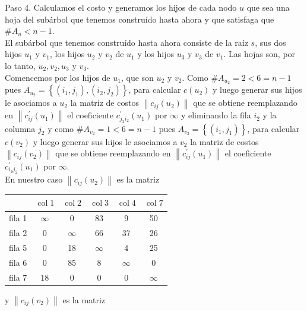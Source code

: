 \documentclass[10pt]{article}
\begin{document}
Paso 4. Calculamos el costo y generamos los hijos de cada nodo $u$ que sea una hoja del subárbol que tenemos construído hasta ahora y que satisfaga que $\# A_{u}<n-1$.\\
El subárbol que tenemos construído hasta ahora consiste de la raíz $s$, sus dos hijos $u_{1}$ y $v_{1}$, los hijos $u_{2}$ y $v_{2}$ de $u_{1}$ y los hijos $u_{3}$ y $v_{3}$ de $v_{1}$. Las hojas son, por lo tanto, $u_{2}, v_{2}, u_{3}$ y $v_{3}$.\\
Comencemos por los hijos de $u_{1}$, que son $u_{2}$ y $v_{2}$. Como $\# A_{u_{2}}=2<6=n-1$ pues $A_{u_{2}}=\left\{\left(i_{1}, j_{1}\right),\left(i_{2}, j_{2}\right)\right\}$, para calcular $c\left(u_{2}\right)$ y luego generar sus hijos le asociamos a $u_{2}$ la matriz de costos $\left\|c_{i j}\left(u_{2}\right)\right\|$ que se obtiene reemplazando en $\left\|c_{i j}^{\prime}\left(u_{1}\right)\right\|$ el coeficiente $c_{j_{2} i_{2}}^{\prime}\left(u_{1}\right)$ por $\infty$ y eliminando la fila $i_{2}$ y la columna $j_{2}$ y como $\# A_{v_{2}}=1<6=n-1$ pues $A_{v_{2}}=\left\{\left(i_{1}, j_{1}\right)\right\}$, para calcular $c\left(v_{2}\right)$ y luego generar sus hijos le asociamos a $v_{2}$ la matriz de costos $\left\|c_{i j}\left(v_{2}\right)\right\|$ que se obtiene reemplazando en $\left\|c_{i j}^{\prime}\left(u_{1}\right)\right\|$ el coeficiente $c_{i_{2} j_{2}}^{\prime}\left(u_{1}\right)$ por $\infty$.\\
En nuestro caso $\left\|c_{i j}\left(u_{2}\right)\right\|$ es la matriz

\begin{center}
\begin{tabular}{|l|c|c|c|c|c|}
\hline
 & $\operatorname{col} 1$ & $\operatorname{col} 2$ & $\operatorname{col} 3$ & $\operatorname{col} 4$ & $\operatorname{col} 7$ \\
\hline
fila 1 & $\infty$ & 0 & 83 & 9 & 50 \\
\hline
fila 2 & 0 & $\infty$ & 66 & 37 & 26 \\
\hline
fila 5 & 0 & 18 & $\infty$ & 4 & 25 \\
\hline
fila 6 & 0 & 85 & 8 & $\infty$ & 0 \\
\hline
fila 7 & 18 & 0 & 0 & 0 & $\infty$ \\
\hline
\end{tabular}
\end{center}

y $\left\|c_{i j}\left(v_{2}\right)\right\|$ es la matriz
\end{document}
